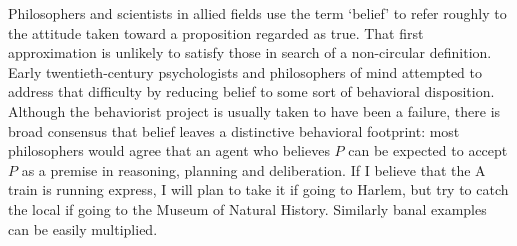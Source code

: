 




\newcommand{\Bel}{\mathcal{B}}
\newcommand{\Cn}{\text{\textit{Cn}}}
\newcommand{\Df}{\mathsf{Df}}
\newcommand{\Min}{\text{Min}}
\newcommand{\Beta}{B}
\newcommand{\cb}{\mathcal{B}}
\newcommand{\nc}{\mathrel{\mid\hspace{-.08em}\!\sim}}
\newcommand{\nnc}{\mathrel{\cancel{\nc}}}
\newcommand{\ncp}{\nc_<}



Philosophers and scientists in allied fields use the term `belief' to refer
roughly to the attitude taken toward a proposition regarded as true. That first
approximation is unlikely to satisfy those in search of a non-circular
definition. Early twentieth-century psychologists and  philosophers of mind
attempted to address that difficulty by reducing belief to some sort of
behavioral disposition. Although the behaviorist project is usually taken to
have been a failure, there is broad consensus that belief leaves a distinctive
behavioral footprint: most philosophers would agree that an agent who believes
$P$ can be expected to accept $P$ as a premise in reasoning, planning and
deliberation. If I believe that the A train is running express, I will plan to
take it if going to Harlem, but try to catch the local if going to the Museum of
Natural History. Similarly banal examples can be easily multiplied. 

